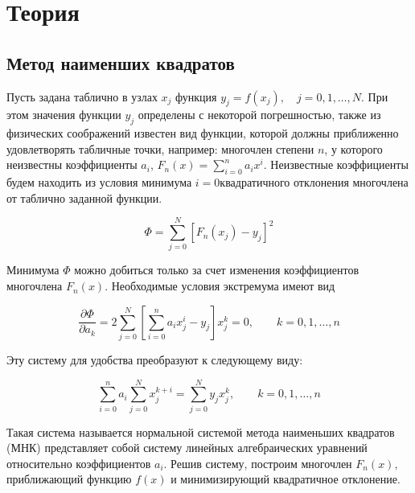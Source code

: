\section*{Теория}

\subsection*{Метод наименших квадратов}
Пусть задана таблично в узлах $x_j$ функция $y_j = f(x_j),\quad j=0,1,\hdots,N$.
При этом значения функции $y_j$ определены с некоторой погрешностью,
также из физических соображений известен вид функции, которой должны
приближенно удовлетворять табличные точки, например: многочлен степени $n$,
у которого неизвестны коэффициенты $a_i$,
$F_n(x)=\displaystyle\sum_{i=0}^n a_ix^i$.
Неизвестные коэффициенты будем находить из условия минимума
$i = 0$квадратичного отклонения многочлена от таблично заданной функции.

$$\Phi=\sum_{j=0}^{N}\left[F_n(x_j) - y_j\right]^2$$

Минимума $\Phi$
можно добиться только за счет изменения коэффициентов
многочлена $F_n(x)$. Необходимые условия экстремума имеют вид

$$\frac{\partial\Phi}{\partial a_k}=2\sum_{j=0}^{N}
\left[\sum_{i=0}^{n} a_ix_j^i - y_j\right]x_j^k=0,\qquad k = 0,1,\hdots,n$$

Эту систему для удобства преобразуют к следующему виду:

$$\sum_{i=0}^{n}a_i\sum_{j=0}^{N}x_j^{k+i} =
\sum_{j=0}^{N} y_jx_j^k,\qquad k = 0,1,\hdots,n$$

Такая система называется нормальной системой метода наименьших квадратов
(МНК) представляет собой систему линейных алгебраических уравнений относительно
коэффициентов $a_i$. Решив систему, построим многочлен $F_n(x)$, приближающий
функцию $f(x)$ и минимизирующий квадратичное отклонение.
\pagebreak